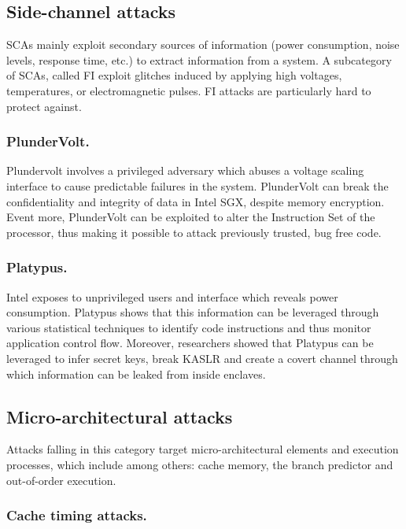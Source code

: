 \documentclass[runningheads,a4paper]{uwsese}
\begin{document}
\subsection{Side-channel attacks}
\label{sidechannel_attacks}

\glspl{SCA} mainly exploit secondary sources of
information (power consumption, noise levels, response time, etc.) to extract
information from a system. A subcategory of \glspl{SCA}, called \gls{FI} exploit glitches induced by applying high voltages, temperatures, or
electromagnetic pulses. \gls{FI} attacks are particularly hard to protect against.

\subsubsection{PlunderVolt.}

Plundervolt \cite{plundervolt} involves a privileged adversary which abuses a
voltage scaling interface to cause predictable failures in the system. PlunderVolt
can break the confidentiality and integrity of data in Intel SGX, despite memory
encryption. Event more, PlunderVolt can be exploited to alter the Instruction Set
of the processor, thus making it possible to attack previously trusted, bug free
code.

\subsubsection{Platypus.}

Intel exposes to unprivileged users and interface which reveals power
consumption. Platypus \cite{platypus} shows that this information can be
leveraged through various statistical techniques to identify code instructions
and thus monitor application control flow. Moreover, researchers showed that
Platypus can be leveraged to infer secret keys, break KASLR \cite{kaslr} and
create a covert channel through which information can be leaked from inside
enclaves.

\subsection{Micro-architectural attacks}

Attacks falling in this category target micro-architectural elements and
execution processes, which include among others: cache memory, the branch
predictor and out-of-order execution.

\subsubsection{Cache timing attacks.}
\label{cache_attacks}
\end{document}
